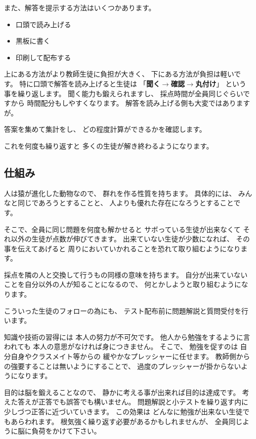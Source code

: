 また、解答を提示する方法はいくつかあります。
\begin{itemize}
 \item 口頭で読み上げる
 \item 黒板に書く
 \item 印刷して配布する
\end{itemize}
上にある方法がより教師生徒に負担が大きく、
下にある方法が負担は軽いです。
特に口頭で解答を読み上げると生徒は
「\textbf{聞く$\rightarrow$確認$\rightarrow$丸付け}」
という事を繰り返します。
聞く能力も鍛えられますし、
採点時間が全員同じぐらいですから
時間配分もしやすくなります。
解答を読み上げる側も大変ではありますが。


答案を集めて集計をし、
どの程度計算ができるかを確認します。


これを何度も繰り返すと
多くの生徒が解き終わるようになります。





\subsection{仕組み}

人は猿が進化した動物なので、
群れを作る性質を持ちます。
具体的には、
みんなと同じであろうとすることと、
人よりも優れた存在になろうとすることです。

そこで、全員に同じ問題を何度も解かせると
サボっている生徒が出来なくて
それ以外の生徒が点数が伸びてきます。
出来ていない生徒が少数になれば、
その事を伝えてあげると
周りにおいていかれることを恐れて取り組むようになります。

採点を隣の人と交換して行うもの同様の意味を持ちます。
自分が出来ていないことを自分以外の人が知ることになるので、
何とかしようと取り組むようになります。

こういった生徒のフォローの為にも、
テスト配布前に問題解説と質問受付を行います。


知識や技術の習得には
本人の努力が不可欠です。
他人から勉強をするように言われても
本人の意思がなければ身につきません。
そこで、
勉強を促すのは
自分自身やクラスメイト等からの
緩やかなプレッシャーに任せます。
教師側からの強要することは無いようにすることで、
過度のプレッシャーが掛からないようになります。



目的は脳を鍛えることなので、
静かに考える事が出来れば目的は達成です。
考えた答えが正答でも誤答でも構いません。
問題解説と小テストを繰り返す内に少しづつ正答に近づいていきます。
この効果は
どんなに勉強が出来ない生徒でもあらわれます。
根気強く繰り返す必要があるかもしれませんが、
全員同じように脳に負荷をかけて下さい。
